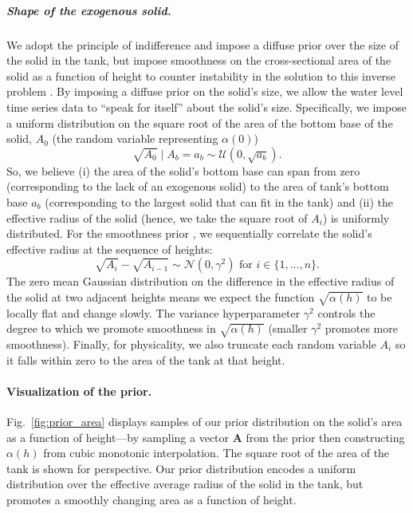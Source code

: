 \documentclass[openacc]{rsproca_new}%
\begin{document}
\vspace{-\baselineskip}
\subparagraph{Shape of the exogenous solid.}
We adopt the principle of indifference and impose a diffuse prior over the size of the solid in the tank, but impose smoothness on the cross-sectional area of the solid as a function of height to counter instability in the solution to this inverse problem \cite{groetsch1993inverse_tl}. 
By imposing a diffuse prior on the solid's size, we allow the water level time series data to ``speak for itself'' about the solid's size.
Specifically, we impose a uniform distribution on the square root of the area of the bottom base of the solid, $A_0$ (the random variable representing $\alpha(0)$)
\begin{equation}
	\sqrt{A_0} \mid A_b=a_b \sim \mathcal{U}(0, \sqrt{a_b}).
\end{equation}
So, we believe 
(i) the area of the solid's bottom base can span from zero (corresponding to the lack of an exogenous solid) to the area of tank's bottom base $a_b$ (corresponding to the largest solid that can fit in the tank) and
(ii) the effective radius of the solid (hence, we take the square root of $A_i$) is uniformly distributed.
For the smoothness prior \cite{calvetti2018inverse}, we sequentially correlate the solid's effective radius at the sequence of heights: 
\begin{equation}
 \sqrt{A_i} - \sqrt{A_{i-1}} \sim \mathcal{N}(0, \gamma^2) \text{ for } i \in \{1, ..., n\}.
\end{equation} 
The zero mean Gaussian distribution on the difference in the effective radius of the solid at two adjacent heights means we expect the function $\sqrt{\alpha(h)}$ to be locally flat and change slowly. 
The variance hyperparameter $\gamma^2$ controls the degree to which we promote smoothness in $\sqrt{\alpha (h)}$ (smaller $\gamma^2$ promotes more smoothness). 
Finally, for physicality, we also truncate each random variable $A_i$ so it falls within zero to the area of the tank at that height.

\paragraph{Visualization of the prior.}
Fig.~\ref{fig:prior_area} displays samples of our prior distribution on the solid's area as a function of height---by sampling a vector $\mathbf{A}$ from the prior then constructing $\alpha(h)$ from cubic monotonic interpolation. The square root of the area of the tank is shown for perspective. 
Our prior distribution encodes a uniform distribution over the effective average radius of the solid in the tank, but promotes a smoothly changing area as a function of height. 
\end{document}
